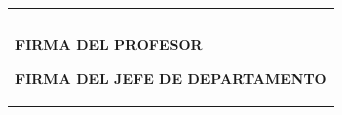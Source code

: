 \documentclass[11pt]{article}
\begin{document}
\begin{center}
\begin{longtable}{|l|}
\begin{minipage}[t]{7in}         
\ \\
\end{minipage}
\                                               \\    \hline                    
\parbox[b][1.0in]{3.5in}{\center \small \textbf{FIRMA DEL PROFESOR}}
\vline 
\parbox[b][1.0in]{3.5in}{\center \small \textbf{FIRMA DEL JEFE DE DEPARTAMENTO}}       \\   \hline
\end{longtable}
\end{center}
\end{document}

